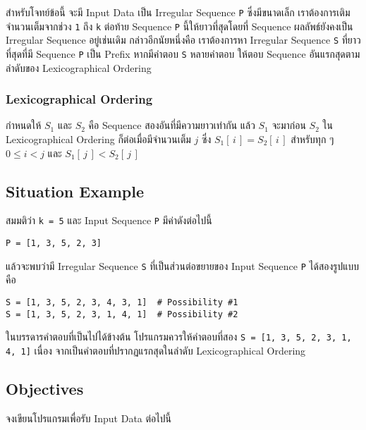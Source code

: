 สำหรับโจทย์ข้อนี้ จะมี Input Data เป็น Irregular Sequence \lstinline{P} ซึ่งมีขนาดเล็ก \;
เราต้องการเติมจำนวนเต็มจากช่วง \lstinline{1} ถึง \lstinline{k} ต่อท้าย Sequence \lstinline{P} นี้ให้ยาวที่สุดโดยที่ Sequence ผลลัพธ์ยังคงเป็น Irregular Sequence อยู่เช่นเดิม \;
กล่าวอีกนัยหนึ่งคือ เราต้องการหา Irregular Sequence \lstinline{S} ที่ยาวที่สุดที่มี Sequence \lstinline{P} เป็น Prefix \;
หากมีคำตอบ \lstinline{S} หลายคำตอบ ให้ตอบ Sequence อันแรกสุดตามลำดับของ Lexicographical Ordering


\subsubsection{Lexicographical Ordering}

\noindent
กำหนดให้ $S_1$ และ $S_2$ คือ Sequence สองอันที่มีความยาวเท่ากัน \;
แล้ว $S_1$ จะมาก่อน $S_2$ ใน Lexicographical Ordering ก็ต่อเมื่อมีจำนวนเต็ม $j$ ซึ่ง $S_1[\,i\,] = S_2[\,i\,]$ สำหรับทุก ๆ $0 \leq i < j$ และ $S_1[\,j\,] < S_2[\,j\,]$


\subsection{Situation Example}

\noindent
สมมติว่า \lstinline{k = 5} และ Input Sequence \lstinline{P} มีค่าดังต่อไปนี้

\begin{lstlisting}[numbers=none]
P = [1, 3, 5, 2, 3]
\end{lstlisting}

\noindent
แล้วจะพบว่ามี Irregular Sequence \lstinline{S} ที่เป็นส่วนต่อขยายของ Input Sequence \lstinline{P} ได้สองรูปแบบคือ 

\begin{lstlisting}[numbers=none]
S = [1, 3, 5, 2, 3, 4, 3, 1]  # Possibility #1
S = [1, 3, 5, 2, 3, 1, 4, 1]  # Possibility #2
\end{lstlisting}

\noindent
ในบรรดารคำตอบที่เป็นไปได้ข้างต้น โปรแกรมควรให้คำตอบที่สอง \lstinline{S = [1, 3, 5, 2, 3, 1, 4, 1]} เนื่อง จากเป็นคำตอบที่ปรากฏแรกสุดในลำดับ Lexicographical Ordering


\subsection{Objectives}

\noindent
จงเขียนโปรแกรมเพื่อรับ Input Data ต่อไปนี้

